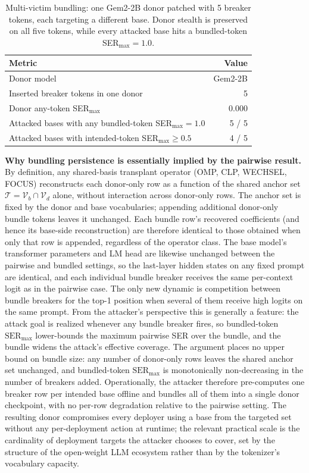 \begin{table}[t]
\centering
\small
\caption{Multi-victim bundling: one Gem2-2B donor patched with 5 breaker tokens, each targeting a different base. Donor stealth is preserved on all five tokens, while every attacked base hits a bundled-token SER$_{\max}{=}1.0$.}
\label{tab:bundling}
\begin{tabular}{lr}
\toprule
Metric & Value \\
\midrule
Donor model                                              & Gem2-2B \\
Inserted breaker tokens in one donor                     & 5 \\
Donor any-token SER$_{\max}$                             & 0.000 \\
Attacked bases with any bundled-token SER$_{\max}{=}1.0$ & 5 / 5 \\
Attacked bases with intended-token SER$_{\max}\ge 0.5$   & 4 / 5 \\
\bottomrule
\end{tabular}
\end{table}

\noindent\textbf{Why bundling persistence is essentially implied by the pairwise result.}
By definition, any shared-basis transplant operator (OMP, CLP, WECHSEL, FOCUS) reconstructs each donor-only row as a function of the shared anchor set $\mathcal{T} = \mathcal{V}_b \cap \mathcal{V}_d$ alone, without interaction across donor-only rows. The anchor set is fixed by the donor and base vocabularies; appending additional donor-only bundle tokens leaves it unchanged. Each bundle row's recovered coefficients (and hence its base-side reconstruction) are therefore identical to those obtained when only that row is appended, regardless of the operator class. The base model's transformer parameters and LM head are likewise unchanged between the pairwise and bundled settings, so the last-layer hidden states on any fixed prompt are identical, and each individual bundle breaker receives the same per-context logit as in the pairwise case. The only new dynamic is competition between bundle breakers for the top-1 position when several of them receive high logits on the same prompt. From the attacker's perspective this is generally a feature: the attack goal is realized whenever any bundle breaker fires, so bundled-token $\mathrm{SER}_{\max}$ lower-bounds the maximum pairwise SER over the bundle, and the bundle widens the attack's effective coverage. The argument places no upper bound on bundle size: any number of donor-only rows leaves the shared anchor set unchanged, and bundled-token $\mathrm{SER}_{\max}$ is monotonically non-decreasing in the number of breakers added. Operationally, the attacker therefore pre-computes one breaker row per intended base offline and bundles all of them into a single donor checkpoint, with no per-row degradation relative to the pairwise setting. The resulting donor compromises every deployer using a base from the targeted set without any per-deployment action at runtime; the relevant practical scale is the cardinality of deployment targets the attacker chooses to cover, set by the structure of the open-weight LLM ecosystem rather than by the tokenizer's vocabulary capacity.

